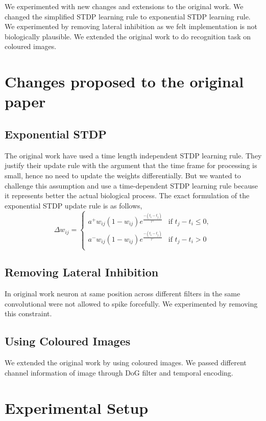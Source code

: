 \documentclass[conference]{IEEEtran}
\begin{document}
We experimented with new changes and extensions to the original work. We changed the simplified STDP learning rule to exponential STDP learning rule. We experimented by removing lateral inhibition as we felt implementation is not biologically plausible. We extended the original work to do recognition task on coloured images.\\

\section{Changes proposed to the original paper}

\subsection{Exponential STDP}
The original work \cite{orig} have used a time length independent STDP learning rule. They justify their update rule with the argument that the time frame for processing is small, hence no need to update the weights differentially. But we wanted to challenge this assumption and use a time-dependent STDP learning rule because it represents better the actual biological process. 
The exact formulation of the exponential STDP update rule is as follows,
$$ \Delta w_{ij} = 
\begin{cases}
    a^{+} w_{ij} (1 - w_{ij}) e ^ { \frac{-(t_i - t_j)}{\tau^{+} } } & \text{if } t_j - t_i \leq 0, \\
    a^{-} w_{ij} (1 - w_{ij}) e ^ { \frac{-(t_i - t_j)}{\tau^{-} } } & \text{if } t_j - t_i > 0 \\
\end{cases} $$

\subsection{Removing Lateral Inhibition}
In original work neuron at same position across different filters in the same convolutional were not allowed to spike forcefully. We experimented by removing this constraint.

\subsection{Using Coloured Images}
We extended the original work by using coloured images. We passed different channel information of image through DoG filter and temporal encoding.

\section{Experimental Setup}
\end{document}
